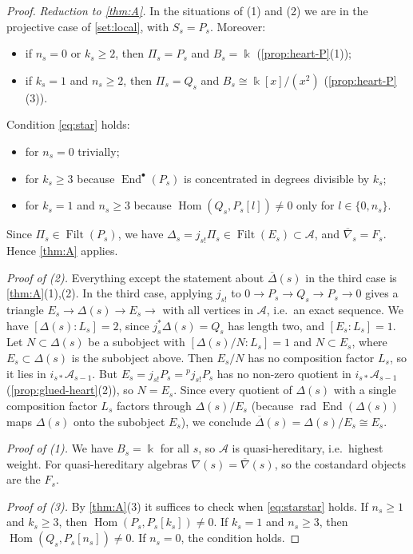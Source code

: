 \documentclass[11pt,reqno]{amsart}
\theoremstyle{plain}
\theoremstyle{definition}
\theoremstyle{remark}
\newcommand{\kk}{\Bbbk}
\DeclareMathOperator{\Hom}{Hom}
\DeclareMathOperator{\End}{End}
\DeclareMathOperator{\Filt}{Filt}
\DeclareMathOperator{\rad}{rad}
\newcommand{\nablabar}{\overline{\nabla}}
\newcommand{\Deltabar}{\overline{\Delta}}
\newcommand{\cA}{\mathcal{A}}
\begin{document}
\begin{proof}
\emph{Reduction to \cref{thm:A}.} In the situations of (1) and (2) we are in the projective case of \cref{set:local}, with $S_s=P_s$. Moreover:
\begin{itemize}
\item if $n_s=0$ or $k_s\ge2$, then $\Pi_s=P_s$ and $B_s=\kk$ (\cref{prop:heart-P}(1));
\item if $k_s=1$ and $n_s\ge2$, then $\Pi_s=Q_s$ and $B_s\cong\kk[x]/(x^2)$ (\cref{prop:heart-P}(3)).
\end{itemize}
Condition \eqref{eq:star} holds:
\begin{itemize}
\item for $n_s=0$ trivially;
\item for $k_s\ge3$ because $\End^\bullet(P_s)$ is concentrated in degrees divisible by $k_s$;
\item for $k_s=1$ and $n_s\ge3$ because $\Hom(Q_s,P_s[l])\ne0$ only for $l\in\{0,n_s\}$.
\end{itemize}
Since $\Pi_s\in\Filt(P_s)$, we have $\Delta_s=j_{s!}\Pi_s\in\Filt(E_s)\subset\cA$, and $\nablabar_s=F_s$. Hence \cref{thm:A} applies.

\emph{Proof of (2).} Everything except the statement about $\Deltabar(s)$ in the third case is \cref{thm:A}(1),(2). In the third case, applying $j_{s!}$ to $0\to P_s\to Q_s\to P_s\to0$ gives a triangle $E_s\to\Delta(s)\to E_s\to$ with all vertices in $\cA$, i.e.\ an exact sequence. We have $[\Delta(s):L_s]=2$, since $j_s^*\Delta(s)=Q_s$ has length two, and $[E_s:L_s]=1$. Let $N\subset\Delta(s)$ be a subobject with $[\Delta(s)/N:L_s]=1$ and $N\subset E_s$, where $E_s\subset\Delta(s)$ is the subobject above. Then $E_s/N$ has no composition factor $L_s$, so it lies in $i_{s*}\cA_{s-1}$. But $E_s=j_{s!}P_s={}^p\!j_{s!}P_s$ has no non-zero quotient in $i_{s*}\cA_{s-1}$ (\cref{prop:glued-heart}(2)), so $N=E_s$. Since every quotient of $\Delta(s)$ with a single composition factor $L_s$ factors through $\Delta(s)/E_s$ (because $\rad\End(\Delta(s))$ maps $\Delta(s)$ onto the subobject $E_s$), we conclude $\Deltabar(s)=\Delta(s)/E_s\cong E_s$.

\emph{Proof of (1).} We have $B_s=\kk$ for all $s$, so $\cA$ is quasi-hereditary, i.e.\ highest weight. For quasi-hereditary algebras $\nabla(s)=\nablabar(s)$, so the costandard objects are the $F_s$.

\emph{Proof of (3).} By \cref{thm:A}(3) it suffices to check when \eqref{eq:starstar} holds. If $n_s\ge1$ and $k_s\ge3$, then $\Hom(P_s,P_s[k_s])\ne0$. If $k_s=1$ and $n_s\ge3$, then $\Hom(Q_s,P_s[n_s])\ne0$. If $n_s=0$, the condition holds.


\end{proof}
\end{document}
